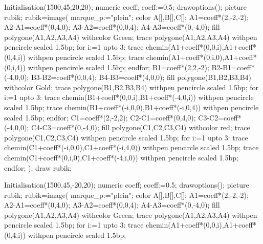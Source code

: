 \begin{debat}
\begin{center}
\begin{Geometrie}[CoinBG={u*(-10,-10)},TypeTrace="Espace"]
            Initialisation(1500,45,20,20);
            numeric coeff;
            coeff:=0.5;             
            drawoptions();
            picture rubik;
            rubik=image(
            marque_p:="plein";
            color A[],B[],C[];            
            A1=coeff*(2,-2,-2);
            A2-A1=coeff*(0,4,0);
            A3-A2=coeff*(0,0,4);
            A4-A3=coeff*(0,-4,0);
            fill polygone(A1,A2,A3,A4) withcolor Green;
            trace polygone(A1,A2,A3,A4) withpen pencircle scaled 1.5bp;	
            for i:=1 upto 3:
                trace chemin(A1+coeff*(0,0,i),A1+coeff*(0,4,i)) withpen pencircle scaled 1.5bp;
                trace chemin(A1+coeff*(0,i,0),A1+coeff*(0,i,4)) withpen pencircle scaled 1.5bp;				
            endfor;	
            B1=coeff*(2,2,-2);
            B2-B1=coeff*(-4,0,0);
            B3-B2=coeff*(0,0,4);
            B4-B3=coeff*(4,0,0);
            fill polygone(B1,B2,B3,B4) withcolor Gold;
            trace polygone(B1,B2,B3,B4) withpen pencircle scaled 1.5bp;
            for i:=1 upto 3:
                trace chemin(B1+coeff*(0,0,i),B1+coeff*(-4,0,i)) withpen pencircle scaled 1.5bp;
                trace chemin(B1+coeff*(-i,0,0),B1+coeff*(-i,0,4)) withpen pencircle scaled 1.5bp;
            endfor;	
            C1=coeff*(2,-2,2);
            C2-C1=coeff*(0,4,0);
            C3-C2=coeff*(-4,0,0);
            C4-C3=coeff*(0,-4,0);
            fill polygone(C1,C2,C3,C4) withcolor red;
            trace polygone(C1,C2,C3,C4) withpen pencircle scaled 1.5bp;
            for i:=1 upto 3:
                trace chemin(C1+coeff*(-i,0,0),C1+coeff*(-i,4,0)) withpen pencircle scaled 1.5bp;
                trace chemin(C1+coeff*(0,i,0),C1+coeff*(-4,i,0)) withpen pencircle scaled 1.5bp;
            endfor;
            );
            draw rubik;	
        \end{Geometrie}
        \begin{Geometrie}[CoinBG={u*(-10,-10)},TypeTrace="Espace"]	        
            Initialisation(1500,45,-20,20);
            numeric coeff;
            coeff:=0.5;             
            drawoptions();
            picture rubik;
            rubik=image(
            marque_p:="plein";
            color A[],B[],C[];            
            A1=coeff*(2,-2,-2);
            A2-A1=coeff*(0,4,0);
            A3-A2=coeff*(0,0,4);
            A4-A3=coeff*(0,-4,0);
            fill polygone(A1,A2,A3,A4) withcolor Green;
            trace polygone(A1,A2,A3,A4) withpen pencircle scaled 1.5bp;	
            for i:=1 upto 3:
                trace chemin(A1+coeff*(0,0,i),A1+coeff*(0,4,i)) withpen pencircle scaled 1.5bp;

\end{Geometrie}
\end{center}
\end{debat}
